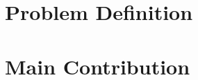 \documentclass[thesis.tex]{subfiles}
\begin{document}
\section{Problem Definition}

\section{Main Contribution}


\subfilebib %
\end{document}
